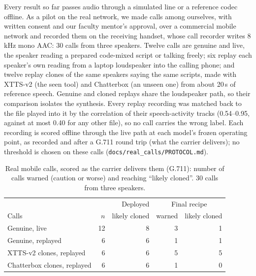 Every result so far passes audio through a simulated line or a reference codec offline. As a
pilot on the real network, we made calls among ourselves, with written consent and our
faculty mentor's approval, over a commercial mobile network and recorded them on the receiving
handset, whose call recorder writes 8\,kHz mono AAC: 30 calls from three speakers. Twelve
calls are genuine and live, the speaker reading a prepared code-mixed script or talking freely;
six replay each speaker's own reading from a laptop loudspeaker into the calling phone; and
twelve replay clones of the same speakers saying the same scripts, made with XTTS-v2 (the seen
tool) and Chatterbox (an unseen one) from about 20\,s of reference speech. Genuine and cloned
replays share the loudspeaker path, so their comparison isolates the synthesis. Every replay
recording was matched back to the file played into it by the correlation of their
speech-activity tracks (0.54--0.95, against at most 0.40 for any other file), so no call
carries the wrong label. Each recording is scored offline through the live path at each
model's frozen operating point, as recorded and after a G.711 round trip (what the carrier
delivers); no threshold is chosen on these calls (\texttt{docs/real\_calls/PROTOCOL.md}).

\begin{table}[t]
\centering
\caption{Real mobile calls, scored as the carrier delivers them (G.711): number of calls warned
(caution or worse) and reaching ``likely cloned''. 30 calls from three speakers.}
\label{tab:realcalls}
\footnotesize
\setlength{\tabcolsep}{3pt}
\begin{tabular}{@{}lrrrr@{}}
\toprule
 & & Deployed & \multicolumn{2}{c}{Final recipe} \\
Calls & $n$ & likely cloned & warned & likely cloned \\
\midrule
Genuine, live & 12 & 8 & 3 & 1 \\
Genuine, replayed & 6 & 6 & 1 & 1 \\
XTTS-v2 clones, replayed & 6 & 6 & 5 & 5 \\
Chatterbox clones, replayed & 6 & 6 & 1 & 0 \\
\bottomrule
\end{tabular}
\end{table}

